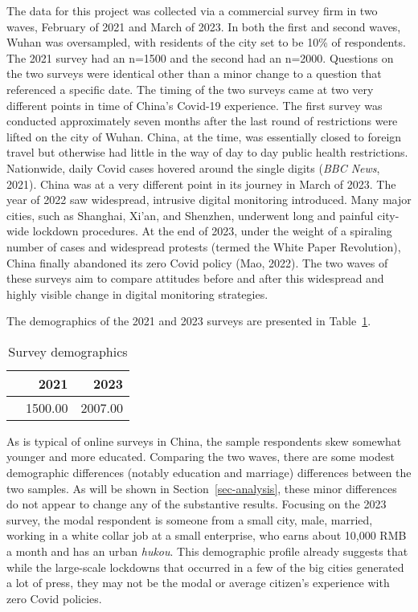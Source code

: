 \documentclass[
  letterpaper,
  DIV=11,
  numbers=noendperiod]{scrartcl}
\begin{document}
The data for this project was collected via a commercial survey firm in
two waves, February of 2021 and March of 2023. In both the first and
second waves, Wuhan was oversampled, with residents of the city set to
be 10\% of respondents. The 2021 survey had an n=1500 and the second had
an n=2000. Questions on the two surveys were identical other than a
minor change to a question that referenced a specific date. The timing
of the two surveys came at two very different points in time of China's
Covid-19 experience. The first survey was conducted approximately seven
months after the last round of restrictions were lifted on the city of
Wuhan. China, at the time, was essentially closed to foreign travel but
otherwise had little in the way of day to day public health
restrictions. Nationwide, daily Covid cases hovered around the single
digits (\emph{BBC News}, 2021). China was at a very different point in
its journey in March of 2023. The year of 2022 saw widespread, intrusive
digital monitoring introduced. Many major cities, such as Shanghai,
Xi'an, and Shenzhen, underwent long and painful city-wide lockdown
procedures. At the end of 2023, under the weight of a spiraling number
of cases and widespread protests (termed the White Paper Revolution),
China finally abandoned its zero Covid policy (Mao, 2022). The two waves
of these surveys aim to compare attitudes before and after this
widespread and highly visible change in digital monitoring strategies.

The demographics of the 2021 and 2023 surveys are presented in
Table~\ref{tbl-demographics}.

\hypertarget{tbl-demographics}{}
\begin{table}
\caption{\label{tbl-demographics}Survey demographics }\tabularnewline

\centering
\begin{tabular}[t]{lrr}
\toprule
  & 2021 & 2023\\
\midrule
 & \num{1500.00} & \num{2007.00}\\
\bottomrule
\end{tabular}
\end{table}

As is typical of online surveys in China, the sample respondents skew
somewhat younger and more educated. Comparing the two waves, there are
some modest demographic differences (notably education and marriage)
differences between the two samples. As will be shown in
Section~\ref{sec-analysis}, these minor differences do not appear to
change any of the substantive results. Focusing on the 2023 survey, the
modal respondent is someone from a small city, male, married, working in
a white collar job at a small enterprise, who earns about 10,000 RMB a
month and has an urban \emph{hukou}. This demographic profile already
suggests that while the large-scale lockdowns that occurred in a few of
the big cities generated a lot of press, they may not be the modal or
average citizen's experience with zero Covid policies.
\end{document}
